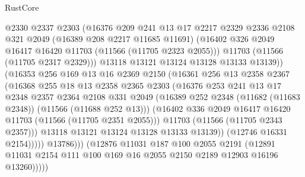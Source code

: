 \begin{lexlean}{RustCore}
\begin{coremodule}
                          @2330
                          @2337
                          @2303
                          (@16376
                            @209
                            @241
                            @13
                            @17
                            @2217
                            @2329
                            @2336
                            @2108
                            @321
                            @2049
                            (@16389 @208 @2217 @11685 @11691)
                            (@16402 @326 @2049 @16417 @16420 @11703 (@11566 (@11705 @2323 @2055)))
                            @11703
                            (@11566 (@11705 @2317 @2329)))
                          @13118
                          @13121
                          @13124
                          @13128
                          @13133
                          @13139))
                      (@16353
                        @256
                        @169
                        @13
                        @16
                        @2369
                        @2150
                        (@16361
                          @256
                          @13
                          @2358
                          @2367
                          (@16368
                            @255
                            @18
                            @13
                            @2358
                            @2365
                            @2303
                            (@16376
                              @253
                              @241
                              @13
                              @17
                              @2348
                              @2357
                              @2364
                              @2108
                              @331
                              @2049
                              (@16389 @252 @2348 (@11682 (@11683 @2348)) (@11566 (@11688 @252 @13)))
                              (@16402 @336 @2049 @16417 @16420 @11703 (@11566 (@11705 @2351 @2055)))
                              @11703
                              (@11566 (@11705 @2343 @2357)))
                            @13118
                            @13121
                            @13124
                            @13128
                            @13133
                            @13139))
                        (@12746 @16331 @2154)))))
                @13786)))
          (@12876
            @11031
            @187
            @100
            @2055
            @2191
            (@12891 @11031 @2154 @111 @100 @169 @16 @2055 @2150 @2189 @12903 @16196 @13260)))))

\end{coremodule}
\end{lexlean}
